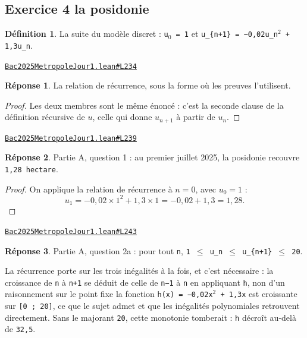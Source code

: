 \documentclass[11pt,a4paper]{article}
\theoremstyle{definition}
\newtheorem{definition}{Définition}
\theoremstyle{plain}
\theoremstyle{definition}
\newtheorem*{reponse}{Réponse}
\newcommand{\source}[2]{\par\smallskip\noindent\hfill{\footnotesize\href{#1}{\texttt{#2}}}\par\smallskip}
\begin{document}
\subsection{Exercice 4 \textemdash{} la posidonie}

\begin{definition}
La suite du modèle discret : \texttt{u\(_{0}\) = 1} et \texttt{u\_\{n+1\} = −0,02u\_n\(^{2}\) + 1,3u\_n}.
\end{definition}
\source{https://github.com/Commutator-IO/learn-lean/blob/main/exams/2025/Bac2025MetropoleJour1.lean\#L234}{Bac2025MetropoleJour1.lean\#L234}

\begin{reponse}
La relation de récurrence, sous la forme où les preuves l'utilisent.
\end{reponse}
\begin{proof}
Les deux membres sont le même énoncé : c'est la seconde clause de la définition récursive
de $u$, celle qui donne $u_{n+1}$ à partir de $u_n$.
\end{proof}
\source{https://github.com/Commutator-IO/learn-lean/blob/main/exams/2025/Bac2025MetropoleJour1.lean\#L239}{Bac2025MetropoleJour1.lean\#L239}

\begin{reponse}
Partie A, question 1 : au premier juillet 2025, la posidonie recouvre
\texttt{1,28 hectare}.
\end{reponse}
\begin{proof}
On applique la relation de récurrence à $n = 0$, avec $u_0 = 1$ :
\[ u_1 = -0{,}02 \times 1^2 + 1{,}3 \times 1 = -0{,}02 + 1{,}3 = 1{,}28 . \]
\end{proof}
\source{https://github.com/Commutator-IO/learn-lean/blob/main/exams/2025/Bac2025MetropoleJour1.lean\#L243}{Bac2025MetropoleJour1.lean\#L243}

\begin{reponse}
Partie A, question 2a : pour tout \texttt{n}, \texttt{1 \(\le\) u\_n \(\le\) u\_\{n+1\} \(\le\) 20}.

La récurrence porte sur les trois inégalités à la fois, et c'est nécessaire : la
croissance de \texttt{n} à \texttt{n+1} se déduit de celle de \texttt{n−1} à \texttt{n} en appliquant \texttt{h}, non
d'un raisonnement sur le point fixe \textemdash{} la fonction \texttt{h(x) = −0,02x\(^{2}\) + 1,3x} est
croissante sur \texttt{[0 ; 20]}, ce que le sujet admet et que les inégalités polynomiales
retrouvent directement. Sans le majorant \texttt{20}, cette monotonie tomberait : \texttt{h}
décroît au-delà de \texttt{32,5}.
\end{reponse}
\end{document}

